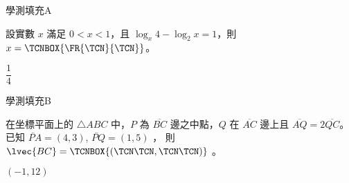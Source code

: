 \begin{QUESTIONS}
    \begin{QUESTION}
        \begin{ExamInfo}{96}{學測}{填充}{A}
        \end{ExamInfo}
        \begin{ExamAnsRateInfo}{41}{77}{36}{10}
        \end{ExamAnsRateInfo}
        \begin{QBODY}
            設實數 $x$ 滿足 $0<x<1$，且 $\log_x 4 - \log_2 x=1$，則 $x=\TCNBOX{\FR{\TCN}{\TCN}}$。
        \end{QBODY}
        \begin{QFROMS}
        \end{QFROMS}
        \begin{QTAGS}\end{QTAGS}
        \begin{QANS}
            $\dfrac{1}{4}$
        \end{QANS}
        \begin{QSOLLIST}
        \end{QSOLLIST}
        \begin{QEMPTYSPACE}
        \end{QEMPTYSPACE}
    \end{QUESTION}
    \begin{QUESTION}
        \begin{ExamInfo}{96}{學測}{填充}{B}
        \end{ExamInfo}
        \begin{ExamAnsRateInfo}{27}{64}{16}{1}
        \end{ExamAnsRateInfo}
        \begin{QBODY}
            在坐標平面上的 $\triangle ABC$ 中，$P$ 為 $\overline{BC}$ 邊之中點，$Q$ 在 $\overline{AC}$ 邊上且 $\overline{AQ} = 2\overline{QC}$。 已知 $\lvec{PA} =(4, 3)$, $\lvec{PQ} = ( 1 , 5 )$ ， 則 $\lvec{BC} = \TCNBOX{(\TCN\TCN,\TCN\TCN)}$ 。
        \end{QBODY}
        \begin{QFROMS}
        \end{QFROMS}
        \begin{QTAGS}\end{QTAGS}
        \begin{QANS}
            $(-1,12)$
        \end{QANS}
        \begin{QSOLLIST}

\end{QSOLLIST}
\end{QUESTION}
\end{QUESTIONS}
